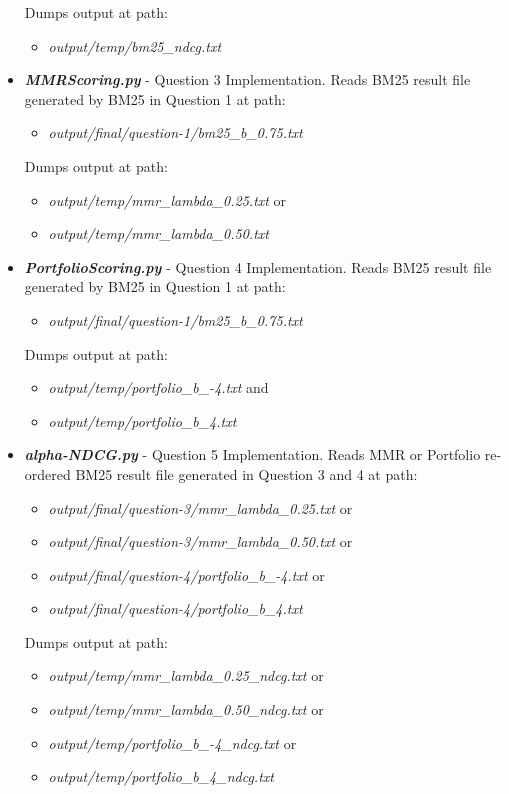 \documentclass{article} %
\begin{document}
\begin{itemize}
\begin{itemize}
    \end{itemize}
    Dumps output at path: 
    \begin{itemize}
        \item \textit{output/temp/bm25\_ndcg.txt}
    \end{itemize}
    \item \textit{\textbf{MMRScoring.py}} - Question 3 Implementation. Reads BM25 result file generated by BM25 in Question 1 at path:
    \begin{itemize}
        \item \textit{output/final/question-1/bm25\_b\_0.75.txt}
    \end{itemize}
    Dumps output at path:
    \begin{itemize}
        \item \textit{output/temp/mmr\_lambda\_0.25.txt} or
        \item \textit{output/temp/mmr\_lambda\_0.50.txt}
    \end{itemize}
    \item \textit{\textbf{PortfolioScoring.py}} - Question 4 Implementation. Reads BM25 result file generated by BM25 in Question 1 at path:
    \begin{itemize}
        \item \textit{output/final/question-1/bm25\_b\_0.75.txt}
    \end{itemize}
    Dumps output at path:
    \begin{itemize}
        \item \textit{output/temp/portfolio\_b\_-4.txt} and
        \item \textit{output/temp/portfolio\_b\_4.txt}
    \end{itemize}
    \item \textit{\textbf{alpha-NDCG.py}} - Question 5 Implementation. Reads MMR or Portfolio re-ordered BM25 result file generated in Question 3 and 4 at path:
    \begin{itemize}
        \item \textit{output/final/question-3/mmr\_lambda\_0.25.txt} or
        \item \textit{output/final/question-3/mmr\_lambda\_0.50.txt} or
        \item \textit{output/final/question-4/portfolio\_b\_-4.txt} or
        \item \textit{output/final/question-4/portfolio\_b\_4.txt}
    \end{itemize}
    Dumps output at path:
    \begin{itemize}
        \item \textit{output/temp/mmr\_lambda\_0.25\_ndcg.txt} or
        \item \textit{output/temp/mmr\_lambda\_0.50\_ndcg.txt} or
        \item \textit{output/temp/portfolio\_b\_-4\_ndcg.txt} or
        \item \textit{output/temp/portfolio\_b\_4\_ndcg.txt}
    \end{itemize}
\end{itemize}
\end{document}

